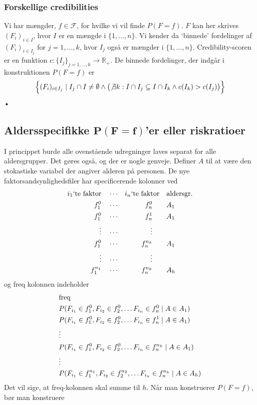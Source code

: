 \documentclass[a4paper, 12pt]{memoir}
\begin{document}
\subsubsection{Forskellige credibilities}
Vi har mængder, $f\in \mathcal F$, for hvilke vi vil finde $P(F=f)$. $F$ kan her skrives $(F_i)_{i\in I}$, hvor $I$ er en mængde i $\{1, \dots, n\}$. Vi kender da `binnede' fordelinger af $(F_i)_{i\in I_j}$ for $j=1, \dots, k$, hvor $I_j$ også er mængder i  $\{1, \dots, n\}$. Credibility-scoren er en funktion $c: \{I_j\}_{j=1, \dots, k} \to \mathbb R_+$. De binnede fordelinger, der indgår i konstruktionen $P(F=f)$ er
\begin{equation*}
\Bigl\{            (F_i)_{i\in I_j} \mid I_j\cap I\neq \emptyset \wedge \bigl(\not\exists k : I\cap I_j\subseteq I\cap I_k \wedge c(I_k)>c(I_j)  \bigr)           \Bigr\}
\end{equation*}•


\subsection{Aldersspecifikke $\bm{P(F=f)}$'er eller riskratioer}
I princippet burde alle ovenstående udregninger laves separat for alle aldersgrupper. Det gøres også, og der er nogle genveje. Definer $A$ til at være den stokastiske variabel der angiver alderen på personen. De nye faktorsandsynlighedsfiler har specificerende kolonner ved
\begin{align*}
 i_1 \textup{`te faktor} \quad& \cdots&  i_n\textup{`te faktor}\quad & \textup{aldersgr.}\\
f_1^0 \quad & \cdots& f_n^0 \qquad& A_1 \\
f_1^0 \quad & \cdots& f_n^1 \qquad&  A_1\\
\vdots\quad &\cdots &\vdots \qquad &\\
f_1^0 \quad & \cdots& f_n^{n_k} \qquad&  A_1 \\
\vdots\quad &\cdots &\vdots \qquad &\\
f_1^{n_1} \quad & \cdots& f_n^{n_k} \qquad& A_h\\
\end{align*}
og freq kolonnen indeholder
\begin{align*}
& \textup{freq}\\
&P(F_{i_1}\in f_1^0, F_{i_2}\in f_2^0, \dots F_{i_n}\in f_n^0\mid A\in A_1)\\
&P(F_{i_1}\in f_1^0, F_{i_2}\in f_2^0, \dots F_{i_n}\in f_n^1\mid A\in A_1)\\
&\vdots\\
& P(F_{i_1}\in f_1^0, F_{i_2}\in f_2^0, \dots F_{i_n}\in f_n^{n_k}\mid A\in A_1)\\
&\vdots\\
&P(F_{i_1}\in f_1^{n_1}, F_{i_2}\in f_2^{n_2}, \dots F_{i_n}\in f_n^{n_k}\mid A\in A_h)
\end{align*}
Det vil sige, at freq-kolonnen skal summe til $h$. Når man konstruerer $P(F=f)$, bør man konstruere 
\end{document}
